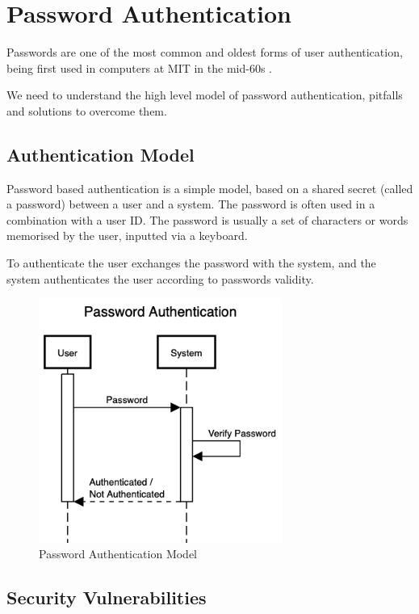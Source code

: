 \section{Password Authentication}

Passwords are one of the most common and oldest forms of user authentication, being first used in computers at MIT in the mid-60s \cite{mcmillan2012password}.

We need to understand the high level model of password authentication, pitfalls and solutions to overcome them.

\subsection{Authentication Model}

Password based authentication is a simple model, based on a shared secret (called a password) between a user and a system.
The password is often used in a combination with a user ID. 
The password is usually a set of characters or words memorised by the user, inputted via a keyboard.

To authenticate the user exchanges the password with the system, and the system authenticates the user according to passwords validity.

\begin{figure}[h]
	\centering
	\includegraphics[height=8cm]{images/password-authentication}
	\caption{Password Authentication Model}
	\label{fig:password-authentication}
\end{figure}

\subsection{Security Vulnerabilities}
\label{label:password-vulnerabilities}

